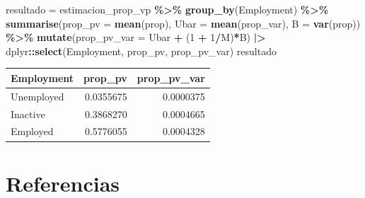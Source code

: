 \documentclass[
  spanish,
  12pt,
]{book}
\newenvironment{Shaded}{\begin{snugshade}}{\end{snugshade}}
\newcommand{\AttributeTok}[1]{\textcolor[rgb]{0.13,0.29,0.53}{#1}}
\newcommand{\DecValTok}[1]{\textcolor[rgb]{0.00,0.00,0.81}{#1}}
\newcommand{\FunctionTok}[1]{\textcolor[rgb]{0.13,0.29,0.53}{\textbf{#1}}}
\newcommand{\NormalTok}[1]{#1}
\newcommand{\OtherTok}[1]{\textcolor[rgb]{0.56,0.35,0.01}{#1}}
\newcommand{\SpecialCharTok}[1]{\textcolor[rgb]{0.81,0.36,0.00}{\textbf{#1}}}
\begin{document}
\begin{Shaded}
\begin{Highlighting}[]
\NormalTok{resultado }\OtherTok{=}\NormalTok{ estimacion\_prop\_vp }\SpecialCharTok{\%\textgreater{}\%} 
  \FunctionTok{group\_by}\NormalTok{(Employment) }\SpecialCharTok{\%\textgreater{}\%} 
  \FunctionTok{summarise}\NormalTok{(}\AttributeTok{prop\_pv =} \FunctionTok{mean}\NormalTok{(prop),}
            \AttributeTok{Ubar =} \FunctionTok{mean}\NormalTok{(prop\_var),}
            \AttributeTok{B =} \FunctionTok{var}\NormalTok{(prop)) }\SpecialCharTok{\%\textgreater{}\%} 
  \FunctionTok{mutate}\NormalTok{(}\AttributeTok{prop\_pv\_var =}\NormalTok{ Ubar }\SpecialCharTok{+}\NormalTok{ (}\DecValTok{1} \SpecialCharTok{+} \DecValTok{1}\SpecialCharTok{/}\NormalTok{M)}\SpecialCharTok{*}\NormalTok{B) }\SpecialCharTok{|\textgreater{}} 
\NormalTok{  dplyr}\SpecialCharTok{::}\FunctionTok{select}\NormalTok{(Employment, prop\_pv, prop\_pv\_var)}
\NormalTok{resultado}
\end{Highlighting}
\end{Shaded}

\begin{tabular}{l|r|r}
\hline
Employment & prop\_pv & prop\_pv\_var\\
\hline
Unemployed & 0.0355675 & 0.0000375\\
\hline
Inactive & 0.3868270 & 0.0004665\\
\hline
Employed & 0.5776055 & 0.0004328\\
\hline
\end{tabular}

\chapter{Referencias}\label{referencias}
\end{document}
